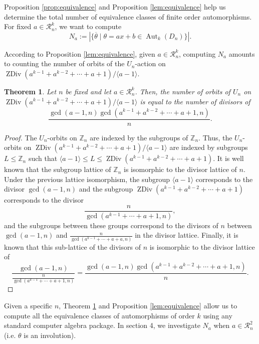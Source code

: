 \documentclass[12pt]{amsart}
\numberwithin{equation}{section}
\newtheorem{theorem}{Theorem}[section]
\theoremstyle{definition}
\newcommand{\Aut}{\operatorname{Aut}}
\newcommand{\Z}{\mathbb{Z}}
\newcommand{\zdiv}[1]{{\operatorname{ZDiv}(#1)}}
\renewcommand{\Z}{\mathbb{Z}}
\begin{document}
Proposition \ref{prop:equivalence} and Proposition \ref{lem:equivalence} help us determine the total number of equivalence classes of finite order automorphisms. For fixed $a\in\mathcal{R}_n^k$, we want to compute 
\begin{equation}
\label{eq:numequiv}
N_a:=|\{\overline{\theta}\mid \theta=ax+b\in\Aut_k(D_n)\}|.
\end{equation}

According to Proposition \ref{lem:equivalence}, given $a\in\mathcal{R}_n^k$, computing $N_a$ amounts to counting the number of orbits of the $U_n$-action on $\zdiv{a^{k-1}+a^{k-2}+\cdots +a+1}/\langle a-1\rangle$. 

\begin{theorem}
\label{unorbits}
Let $n$ be fixed and let $a\in\mathcal{R}_n^k$. Then, the number of orbits of $U_n$ on $\zdiv{a^{k-1}+a^{k-2}+\cdots +a+1}/\langle a-1\rangle$ is equal to the number of divisors of 
$$\frac{\gcd(a-1,n)\gcd(a^{k-1}+a^{k-2}+\cdots+a+1,n)}{n}.$$
\end{theorem}

\begin{proof}
The $U_n$-orbits on $\Z_n$ are indexed by the subgroups of $\Z_n$. Thus, the $U_n$-orbits on $\zdiv{a^{k-1}+a^{k-2}+\cdots +a+1}/\langle a-1\rangle$ are indexed by subgroups $L\leq \Z_n$ such that $\langle a-1\rangle\leq L\leq \zdiv{a^{k-1}+a^{k-2}+\cdots +a+1}$. It is well known that the subgroup lattice of $\Z_n$ is isomorphic to the divisor lattice of $n$. Under the previous lattice isomorphism, the subgroup $\langle a-1\rangle$ corresponds to the divisor $\gcd(a-1,n)$ and the subgroup $\zdiv{a^{k-1}+a^{k-2}+\cdots +a+1}$ corresponds to the divisor $$\frac{n}{\gcd(a^{k-1}+\cdots+a+1,n)},$$ and the subgroups between these groups correspond to the divisors of $n$ between $\gcd(a-1,n)$ and  $\frac{n}{\gcd(a^{k-1}+\cdots+a+a,n)}$ in the divisor lattice. Finally, it is known that this sub-lattice of the divisors of $n$ is isomorphic to the divisor lattice of $$\frac{\gcd(a-1,n)}{\frac{n}{\gcd(a^{k-1}+\cdots+a+1,n)}}=\frac{\gcd(a-1,n)\gcd(a^{k-1}+a^{k-2}+\cdots+a+1,n)}{n}.$$ 
\end{proof}

Given a specific $n$, Theorem \ref{unorbits} and Proposition \ref{lem:equivalence} allow us to compute all the equivalence classes of automorphisms of order $k$ using any standard computer algebra package. In section 4, we investigate $N_a$ when $a\in\mathcal{R}_n^2$ (i.e. $\theta$ is an involution).

\end{document}
